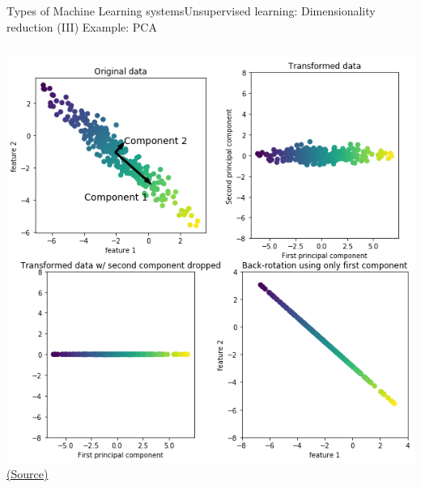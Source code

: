 \documentclass[10pt,compress]{beamer} %
\begin{document}
\begin{frame}[fragile]{Types of Machine Learning systems}{Unsupervised learning: Dimensionality reduction (III)}
	Example: PCA

    \begin{columns}
			\includegraphics[width=\linewidth]{figs/pca.png}
    		\centering \tiny{\href{https://github.com/amueller/introduction_to_ml_with_python/blob/master/03-unsupervised-learning.ipynb}{(Source)}}
    \end{columns}
\end{frame}
\end{document}
